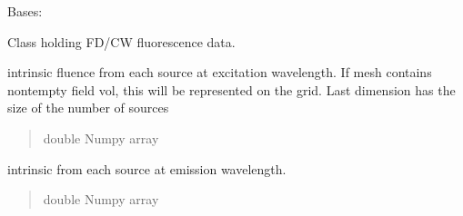 \documentclass[letterpaper,10pt,english]{sphinxmanual}
\begin{document}
\begin{fulllineitems}
\label{\detokenize{_autosummary/nirfasterff.base.data.FLdata:nirfasterff.base.data.FLdata}}
\pysigstartsignatures
{}
\pysigstopsignatures
\sphinxAtStartPar
Bases: 

\sphinxAtStartPar
Class holding FD/CW fluorescence data.

\begin{fulllineitems}
\label{\detokenize{_autosummary/nirfasterff.base.data.FLdata:nirfasterff.base.data.FLdata.phix}}
\pysigstartsignatures
{}
\pysigstopsignatures
\sphinxAtStartPar
intrinsic fluence from each source at excitation wavelength. If mesh contains non\sphinxhyphen{}tempty field vol, this will be represented on the grid. Last dimension has the size of the number of sources
\begin{quote}\begin{description}
\sphinxAtStartPar
double Numpy array

\end{description}\end{quote}

\end{fulllineitems}


\begin{fulllineitems}
\label{\detokenize{_autosummary/nirfasterff.base.data.FLdata:nirfasterff.base.data.FLdata.phimm}}
\pysigstartsignatures
{}
\pysigstopsignatures
\sphinxAtStartPar
intrinsic from each source at emission wavelength.
\begin{quote}\begin{description}
\sphinxAtStartPar
double Numpy array

\end{description}\end{quote}

\end{fulllineitems}



\end{fulllineitems}
\end{document}
